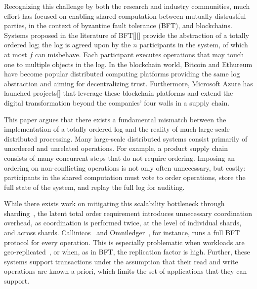 Recognizing this challenge by both the research and industry communities,
much effort has focused
on enabling shared computation between mutually distrustful parties, in the context of byzantine
fault tolerance (BFT), and blockchains.
Systems proposed in the literature of BFT[][] provide the abstraction of
a totally ordered log; the log is agreed upon by the $n$ participants in the system, of which at most $f$ can misbehave.
Each participant executes operations that may touch one to multiple objects in the log.
In the blockchain world,
Bitcoin and Ethureum have become popular distributed computing platforms
providing the same log abstraction and
aiming for decentralizing trust.
Furthermore, Microsoft Azure has launched projects[] that leverage these blockchain platforms and extend the digital transformation
beyond the companies' four walls in a supply chain.


This paper argues that there exists a fundamental mismatch between the implementation of %
a totally ordered log and the reality of much large-scale distributed processing. Many large-scale distributed
systems consist primarily of unordered and unrelated operations.
For example,
a product supply chain consists of many concurrent steps
that do not require ordering. Imposing an ordering on non-conflicting operations is not only often
unnecessary, but costly: participants in the shared computation must vote to order operations, store the full state of
the system, and replay the full log for auditing.

While there exists work on mitigating this scalability bottleneck
through sharding~\cite{}, the latent total order requirement introduces unnecessary coordination overhead, as
coordination is performed twice, at the level of individual shards, and across shards. Callinicos~\cite{} and
Omniledger~\cite{}, for instance, runs a full BFT protocol for every operation. This is especially problematic
when workloads are geo-replicated~\cite{}, or when, as in BFT, the replication factor is high.
Further, these systems
support transactions under the assumption that their read and write operations are known a priori, which
limits the set of applications that they can support.

